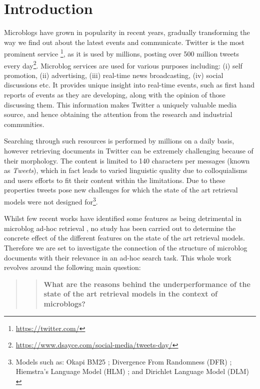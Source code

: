 \section{Introduction}
\label{introduction}

Microblogs have grown in popularity in recent years, gradually transforming the way we find out about the latest events and communicate. Twitter is the most prominent service \footnote{\url{https://twitter.com/}}, as it is used by millions, posting over 500 million tweets every day\footnote{\url{https://www.dsayce.com/social-media/tweets-day/}}. Microblog services are used for various purposes including: (i) self promotion, (ii) advertising, (iii) real-time news broadcasting, (iv) social discussions etc. It provides unique insight into real-time events, such as first hand reports of events as they are developing, along with the opinion of those discussing them. This information makes Twitter a uniquely valuable media source, and hence obtaining the attention from the research and industrial communities. 

Searching through such resources is performed by millions on a daily basis, however retrieving documents in Twitter can be extremely challenging because of their morphology. The content is limited to 140 characters per messages (known as \emph{Tweets}), which in fact leads to varied linguistic quality \cite{teevan2011twittersearch} due to colloquialisms and users efforts to fit their content within the limitations. Due to these properties tweets pose new challenges for which the state of the art retrieval models were not designed for\footnote{Models such as: Okapi BM25 \cite{robertson2009probabilistic}; Divergence From Randomness (DFR) \cite{amati2003probabilistic}; Hiemstra's Language Model (HLM) \cite{model}; and Dirichlet Language Model (DLM) \cite{zhai2001study}}. 

Whilst few recent works have identified some features as being detrimental in microblog ad-hoc retrieval \cite{naveed2011searching}, no study has been carried out to determine the concrete effect of the different features on the state of the art retrieval models. Therefore we are set to investigate the connection of the structure of microblog documents with their relevance in an ad-hoc search task. This whole work revolves around the following main question: 

\begin{quotation}\begin{quote}\textbf{What are the reasons behind the underperformance of the state of the art retrieval models in the context of microblogs?}\end{quote}\end{quotation}

